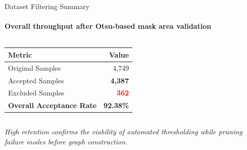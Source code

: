 \documentclass[aspectratio=169, 11pt]{beamer}
\begin{document}
\begin{frame}{Dataset Filtering Summary}
    \framesubtitle{Overall throughput after Otsu-based mask area validation}

    \begin{columns}[c]
        \begin{table}[]
            \centering
            \small
            \begin{tabular}{lr}
                \toprule
                \textbf{Metric} & \textbf{Value} \\
                \midrule
                Original Samples & 4,749 \\
                Accepted Samples & \textbf{\textcolor{green!60!black}{4,387}} \\
                Excluded Samples & \textbf{\textcolor{red}{362}} \\
                \midrule
                \textbf{Overall Acceptance Rate} & \textbf{92.38\%} \\
                \bottomrule
            \end{tabular}
        \end{table}

    \end{columns}

    \vspace{0.4cm}
    \begin{center}
        {\scriptsize\itshape High retention confirms the viability of automated thresholding while pruning failure modes before graph construction.}
    \end{center}
\end{frame}
\end{document}
